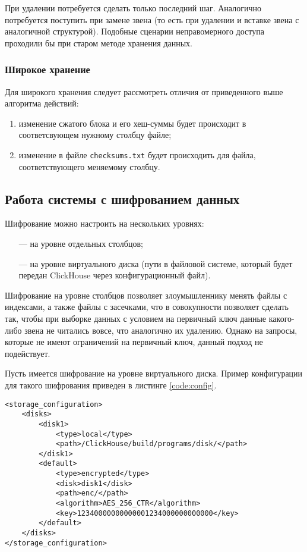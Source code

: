 При удалении потребуется сделать только последний шаг. Аналогично потребуется поступить при замене звена (то есть при удалении и вставке звена с аналогичной структурой). Подобные сценарии неправомерного доступа проходили бы при старом методе хранения данных.

\subsubsection{Широкое хранение}

Для широкого хранения следует рассмотреть отличия от приведенного выше алгоритма действий:
\begin{enumerate}
    \item изменение сжатого блока и его хеш-суммы будет происходит в соответсвующем нужному столбцу файле;
    \item изменение в файле \texttt{checksums.txt} будет происходить для файла, соответствующего меняемому столбцу.
\end{enumerate}

\subsection{Работа системы с шифрованием данных}

Шифрование можно настроить на нескольких уровнях:
\begin{itemize}
    \item [---] на уровне отдельных столбцов;
    \item [---] на уровне виртуального диска (пути в файловой системе, который будет передан ClickHouse через конфигурационный файл).
\end{itemize}

Шифрование на уровне столбцов позволяет злоумышленнику менять файлы с индексами, а также файлы с засечками, что в совокупности позволяет сделать так, чтобы при выборке данных с условием на первичный ключ данные какого-либо звена не читались вовсе, что аналогично их удалению. Однако на запросы, которые не имеют ограничений на первичный ключ, данный подход не подействует.

Пусть имеется шифрование на уровне виртуального диска. Пример конфигурации для такого шифрования приведен в листинге \ref{code:config}.

\begin{lstlisting}[label=code:config, caption={Параметры конфигурации для шифрования на уровне диска.}]
<storage_configuration>
    <disks>
        <disk1>
            <type>local</type>
            <path>/ClickHouse/build/programs/disk/</path>
        </disk1>
        <default>
            <type>encrypted</type>
            <disk>disk1</disk>
            <path>enc/</path>
            <algorithm>AES_256_CTR</algorithm>
            <key>12340000000000001234000000000000</key>
        </default>
    </disks>
</storage_configuration>
\end{lstlisting}


